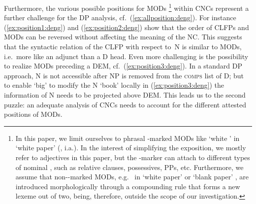 \documentclass[output=paper,colorlinks,citecolor=brown]{langscibook}
\begin{document}
\z 
\z 



Furthermore, the various possible positions for MODs%
%
\footnote{\label{fn1:deng}In this paper, we limit ourselves to phrasal -marked MODs like  `white ' in    `white paper' (\citealp[cf.][]{Paul05a,Sun15a,XuZ18a}, i.a.).  
In the interest of simplifying the exposition, we mostly refer to adjectives in this paper, but the -marker can attach to different types of nominal , such as relative clauses, possessives, PPs, etc. 
Furthermore, we assume that non--marked MODs, e.g.\  in  `white paper' or `blank paper' , are introduced morphologically through a compounding rule that forms a new lexeme out of two, being, therefore, outside the scope of our investigation.} %
%
within CNCs represent a further challenge for the DP analysis, cf.\ (\ref{ex:allposition:deng}). 
For instance (\ref{ex:position1:deng}) and (\ref{ex:position2:deng}) show that the order of CLFPs and MODs can be reversed without affecting the meaning of the NC. This suggests that the syntactic relation of the CLFP with respect to\ N is similar to MODs, i.e.\  more like an adjunct than a D head. 
%
Even more challenging is the possibility to realize MODs preceding a DEM, cf.\ (\ref{ex:position3:deng}). 
% 
In a standard DP approach, N is not accessible after NP is removed from the \textsc{comps} list of D;
but to enable  `big' to modify the N  `book' locally in (\ref{ex:position3:deng}) the information of N needs to be projected above DEM. This leads us to the second puzzle: an adequate analysis of CNCs needs to account for the different attested positions of MODs.   
\end{document}
